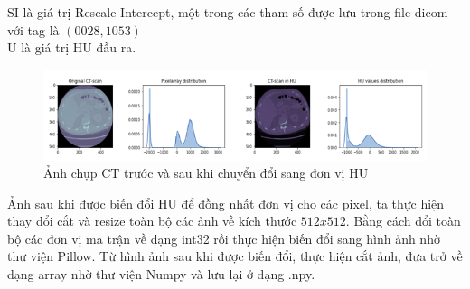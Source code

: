\tab SI là giá trị Rescale Intercept, một trong các tham số được lưu trong file dicom với tag là $(0028,1053)$\\
\tab U là giá trị HU đầu ra.\par
\begin{figure}[ht!]
\centerline{\includegraphics[scale=0.8]{images/data6.png}}
\caption{Ảnh chụp CT trước và sau khi chuyển đổi sang đơn vị HU}
\label{fig:data6}
\end{figure}
Ảnh sau khi được biến đổi HU để đồng nhất đơn vị cho các pixel, ta thực hiện thay đổi cắt và resize toàn bộ các ảnh về kích thước $512 x 512$. Bằng cách đổi toàn bộ các đơn vị ma trận về dạng int32 rồi thực hiện biến đổi sang hình ảnh nhờ thư viện Pillow. Từ hình ảnh sau khi được biến đổi, thực hiện cắt ảnh, đưa trở về dạng array nhờ thư viện Numpy và lưu lại ở dạng .npy.\\
